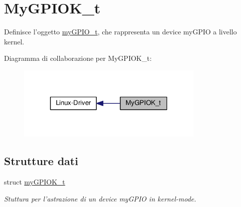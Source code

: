 \hypertarget{group__my_g_p_i_o_k__t}{\section{My\+G\+P\+I\+O\+K\+\_\+t}
\label{group__my_g_p_i_o_k__t}
}


Definisce l'oggetto \hyperlink{structmy_g_p_i_o__t}{my\+G\+P\+I\+O\+\_\+t}, che rappresenta un device my\+G\+P\+I\+O a livello kernel.  


Diagramma di collaborazione per My\+G\+P\+I\+O\+K\+\_\+t\+:
\nopagebreak
\begin{figure}[H]
\begin{center}
\leavevmode
\includegraphics[width=255pt]{group__my_g_p_i_o_k__t}
\end{center}
\end{figure}
\subsection*{Strutture dati}
\begin{DoxyCompactItemize}
\item 
struct \hyperlink{structmy_g_p_i_o_k__t}{my\+G\+P\+I\+O\+K\+\_\+t}
\begin{DoxyCompactList}\small\item\em Stuttura per l'astrazione di un device my\+G\+P\+I\+O in kernel-\/mode. \end{DoxyCompactList}\end{DoxyCompactItemize}

